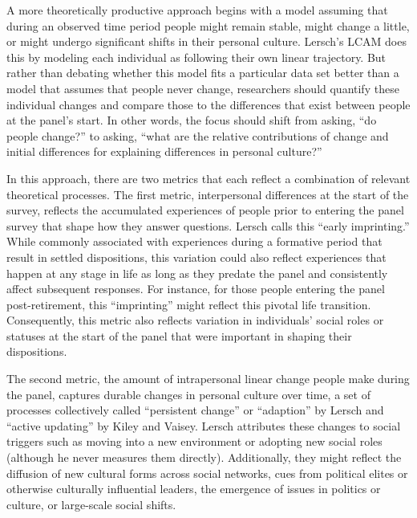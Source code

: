 \documentclass[
  12pt,
]{article}
\begin{document}
A more theoretically productive approach begins with a model assuming
that during an observed time period people might remain stable, might
change a little, or might undergo significant shifts in their personal
culture. Lersch's LCAM does this by modeling each individual as
following their own linear trajectory. But rather than debating whether
this model fits a particular data set better than a model that assumes
that people never change, researchers should quantify these individual
changes and compare those to the differences that exist between people
at the panel's start. In other words, the focus should shift from
asking, ``do people change?'' to asking, ``what are the relative
contributions of change and initial differences for explaining
differences in personal culture?''

In this approach, there are two metrics that each reflect a combination
of relevant theoretical processes. The first metric, interpersonal
differences at the start of the survey, reflects the accumulated
experiences of people prior to entering the panel survey that shape how
they answer questions. Lersch calls this ``early imprinting.'' While
commonly associated with experiences during a formative period that
result in settled dispositions, this variation could also reflect
experiences that happen at any stage in life as long as they predate the
panel and consistently affect subsequent responses. For instance, for
those people entering the panel post-retirement, this ``imprinting''
might reflect this pivotal life transition. Consequently, this metric
also reflects variation in individuals' social roles or statuses at the
start of the panel that were important in shaping their dispositions.

The second metric, the amount of intrapersonal linear change people make
during the panel, captures durable changes in personal culture over
time, a set of processes collectively called ``persistent change'' or
``adaption'' by Lersch and ``active updating'' by Kiley and Vaisey.
Lersch attributes these changes to social triggers such as moving into a
new environment or adopting new social roles (although he never measures
them directly). Additionally, they might reflect the diffusion of new
cultural forms across social networks, cues from political elites or
otherwise culturally influential leaders, the emergence of issues in
politics or culture, or large-scale social shifts.
\end{document}
